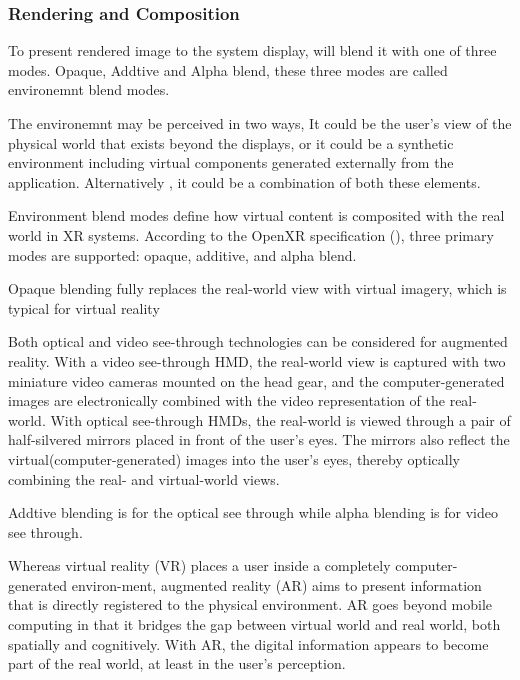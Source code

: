 \subsubsection{Rendering and Composition}

To present rendered image to the system display, \textcite{openxr2024spec} will blend it with one of three modes. Opaque, Addtive and Alpha blend, these three modes are called environemnt blend modes.

The environemnt may be perceived in two ways, It could be the user's view of the physical world that exists beyond the displays, or it could be a synthetic environment including virtual components generated externally from the application. Alternatively , it could be a combination of both these elements.

Environment blend modes define how virtual content is composited with the real world in XR systems. According to the OpenXR specification (\cite{openxr2024spec}), three primary modes are supported: opaque, additive, and alpha blend.

Opaque blending fully replaces the real-world view with virtual imagery, which is typical for virtual reality 

Both optical and video see-through technologies can be considered for augmented reality. With a video see-through HMD, the real-world view is captured with two miniature video cameras mounted on the head gear, and the computer-generated images are electroni­cally combined with the video representation of the real-world. With opti­cal see-through HMDs, the real-world is viewed through a pair of half-silvered mirrors placed in front of the user's eyes. The mirrors also reflect the virtual(computer-generated) images into the user's eyes, thereby optically combining the real- and virtual-world views. \parencite{rolland_head-mounted_2005}

Addtive blending is for the optical see through while alpha blending is for video see through.

Whereas virtual reality (VR) places a user inside a completely computer-generated environ-ment, augmented reality (AR) aims to present information that is directly registered to the physical environment. AR goes beyond mobile computing in that it bridges the gap between virtual world and real world, both spatially and cognitively. With AR, the digital information appears to become part of the real world, at least in the user’s perception. \parencite{schmalstieg_augmented_2016}

